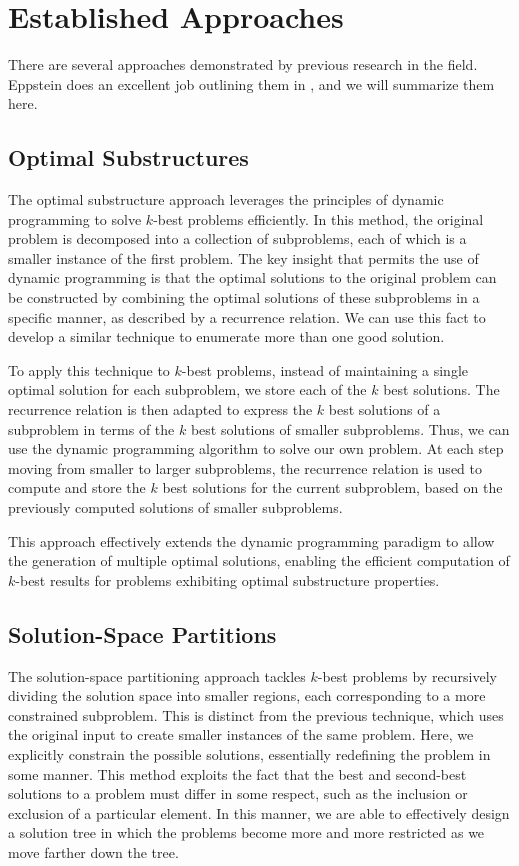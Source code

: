 \section{Established Approaches}
There are several approaches demonstrated by previous research in the field. Eppstein does an excellent job outlining them in \cite{eppstein2014k}, and we will summarize them here. 
\subsection{Optimal Substructures}
The optimal substructure approach leverages the principles of dynamic programming to solve $k$-best problems efficiently. In this method, the original problem is decomposed into a collection of subproblems, each of which is a smaller instance of the first problem. The key insight that permits the use of dynamic programming is that the optimal solutions to the original problem can be constructed by combining the optimal solutions of these subproblems in a specific manner, as described by a recurrence relation. We can use this fact to develop a similar technique to enumerate more than one good solution.

To apply this technique to $k$-best problems, instead of maintaining a single optimal solution for each subproblem, we store each of the $k$ best solutions. The recurrence relation is then adapted to express the $k$ best solutions of a subproblem in terms of the $k$ best solutions of smaller subproblems. Thus, we can use the dynamic programming algorithm to solve our own problem. At each step moving from smaller to larger subproblems, the recurrence relation is used to compute and store the $k$ best solutions for the current subproblem, based on the previously computed solutions of smaller subproblems.

This approach effectively extends the dynamic programming paradigm to allow the generation of multiple optimal solutions, enabling the efficient computation of $k$-best results for problems exhibiting optimal substructure properties.

\subsection{Solution-Space Partitions}
The solution-space partitioning approach tackles $k$-best problems by recursively dividing the solution space into smaller regions, each corresponding to a more constrained subproblem. This is distinct from the previous technique, which uses the original input to create smaller instances of the same problem. Here, we explicitly constrain the possible solutions, essentially redefining the problem in some manner. This method exploits the fact that the best and second-best solutions to a problem must differ in some respect, such as the inclusion or exclusion of a particular element. In this manner, we are able to effectively design a solution tree in which the problems become more and more restricted as we move farther down the tree.

